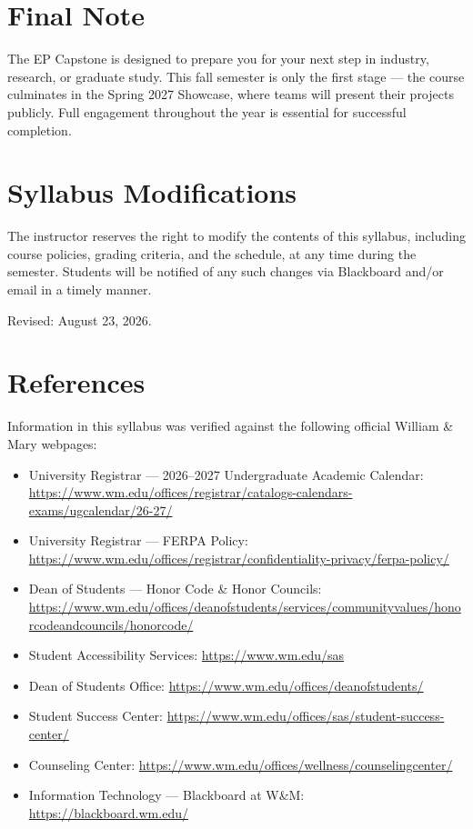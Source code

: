 \documentclass[11pt, letterpaper]{article}
\begin{document}
\section{Final Note}
The EP Capstone is designed to prepare you for your next step in industry, research, or graduate study. This fall semester is only the first stage --- the course culminates in the Spring 2027 Showcase, where teams will present their projects publicly. Full engagement throughout the year is essential for successful completion.

\section{Syllabus Modifications}
The instructor reserves the right to modify the contents of this syllabus, including course policies, grading criteria, and the schedule, at any time during the semester. Students will be notified of any such changes via Blackboard and/or email in a timely manner.

{\ttfamily\small\color{labMauveDark}Revised: August 23, 2026.}

\section{References}
{\small
Information in this syllabus was verified against the following official William \& Mary webpages:
\begin{itemize}
    \item University Registrar --- 2026--2027 Undergraduate Academic Calendar: \url{https://www.wm.edu/offices/registrar/catalogs-calendars-exams/ugcalendar/26-27/}
    \item University Registrar --- FERPA Policy: \url{https://www.wm.edu/offices/registrar/confidentiality-privacy/ferpa-policy/}
    \item Dean of Students --- Honor Code \& Honor Councils: \url{https://www.wm.edu/offices/deanofstudents/services/communityvalues/honorcodeandcouncils/honorcode/}
    \item Student Accessibility Services: \url{https://www.wm.edu/sas}
    \item Dean of Students Office: \url{https://www.wm.edu/offices/deanofstudents/}
    \item Student Success Center: \url{https://www.wm.edu/offices/sas/student-success-center/}
    \item Counseling Center: \url{https://www.wm.edu/offices/wellness/counselingcenter/}
    \item Information Technology --- Blackboard at W\&M: \url{https://blackboard.wm.edu/}
\end{itemize}
}
\end{document}
